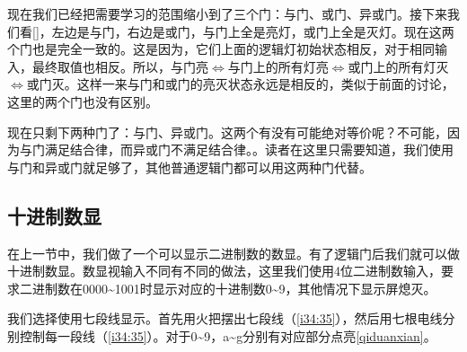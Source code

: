 现在我们已经把需要学习的范围缩小到了三个门：与门、或门、异或门。接下来我们看\autoref{}，左边是与门，右边是或门，与门上全是亮灯，或门上全是灭灯。现在这两个门也是完全一致的。这是因为，它们上面的逻辑灯初始状态相反，对于相同输入，最终取值也相反。所以，与门亮$\Longleftrightarrow$与门上的所有灯亮$\Longleftrightarrow$或门上的所有灯灭$\Longleftrightarrow$或门灭。这样一来与门和或门的亮灭状态永远是相反的，类似于前面的讨论，这里的两个门也没有区别。

现在只剩下两种门了：与门、异或门。这两个有没有可能绝对等价呢？不可能，因为与门满足结合律，而异或门不满足结合律。。读者在这里只需要知道，我们使用与门和异或门就足够了，其他普通逻辑门都可以用这两种门代替。

\subsection{十进制数显}\label{sec2:2}

在上一节中，我们做了一个可以显示二进制数的数显。有了逻辑门后我们就可以做十进制数显。数显视输入不同有不同的做法，这里我们使用4位二进制数输入，要求二进制数在0000\~{}1001时显示对应的十进制数0\~{}9，其他情况下显示屏熄灭。

我们选择使用七段线显示。首先用火把摆出七段线（\autoref{i34:35}），然后用七根电线分别控制每一段线（\autoref{i34:35}）。对于0\~{}9，a\~{}g分别有对应部分点亮\autoref{qiduanxian}。

\begin{figure}[!h]
\begin{center}
\quad
{}
\end{center}
\caption{}
\label{i34:35}
\end{figure}

